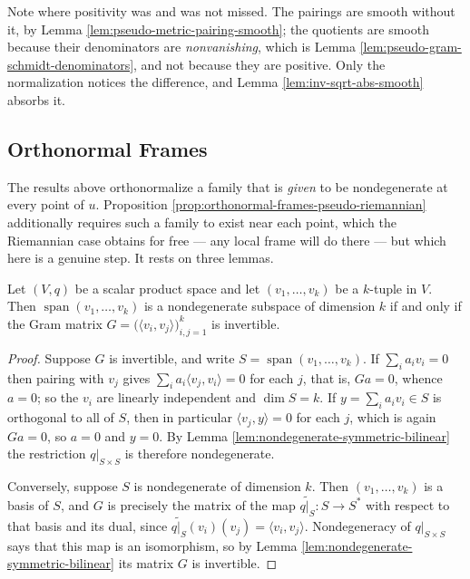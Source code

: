 Note where positivity was and was not missed. The pairings are smooth without it, by Lemma \ref{lem:pseudo-metric-pairing-smooth}; the quotients are smooth because their denominators are \emph{nonvanishing}, which is Lemma \ref{lem:pseudo-gram-schmidt-denominators}, and not because they are positive. Only the normalization notices the difference, and Lemma \ref{lem:inv-sqrt-abs-smooth} absorbs it.

\subsection{Orthonormal Frames}

The results above orthonormalize a family that is \emph{given} to be nondegenerate at every point of $u$. Proposition \ref{prop:orthonormal-frames-pseudo-riemannian} additionally requires such a family to exist near each point, which the Riemannian case obtains for free — any local frame will do there — but which here is a genuine step. It rests on three lemmas.

\begin{lemma}
\label{lem:nondegenerate-tuple-gram-matrix}
\leanok
{}
Let $(V,q)$ be a scalar product space and let $(v_1,\ldots,v_k)$ be a $k$-tuple in $V$. Then $\operatorname{span}(v_1,\ldots,v_k)$ is a nondegenerate subspace of dimension $k$ if and only if the Gram matrix $G = \bigl(\langle v_i, v_j\rangle\bigr)_{i,j=1}^{k}$ is invertible.
\end{lemma}

\begin{proof}
\leanok
{}
Suppose $G$ is invertible, and write $S = \operatorname{span}(v_1,\ldots,v_k)$. If $\sum_i a_i v_i = 0$ then pairing with $v_j$ gives $\sum_i a_i \langle v_j,v_i\rangle = 0$ for each $j$, that is, $Ga = 0$, whence $a = 0$; so the $v_i$ are linearly independent and $\dim S = k$. If $y = \sum_i a_i v_i \in S$ is orthogonal to all of $S$, then in particular $\langle v_j, y\rangle = 0$ for each $j$, which is again $Ga = 0$, so $a = 0$ and $y = 0$. By Lemma \ref{lem:nondegenerate-symmetric-bilinear} the restriction $q|_{S\times S}$ is therefore nondegenerate.

Conversely, suppose $S$ is nondegenerate of dimension $k$. Then $(v_1,\ldots,v_k)$ is a basis of $S$, and $G$ is precisely the matrix of the map $\widetilde{q|_S} : S \to S^*$ with respect to that basis and its dual, since $\widetilde{q|_S}(v_i)(v_j) = \langle v_i,v_j\rangle$. Nondegeneracy of $q|_{S \times S}$ says that this map is an isomorphism, so by Lemma \ref{lem:nondegenerate-symmetric-bilinear} its matrix $G$ is invertible.
\end{proof}

